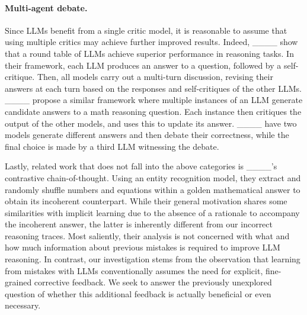 \paragraph{Multi-agent debate.} Since LLMs benefit from a single critic model, it is reasonable to assume that using multiple critics may achieve further improved results. Indeed, ____ show that a round table of LLMs achieve superior performance in reasoning tasks. In their framework, each LLM produces an answer to a question, followed by a self-critique. Then, all models carry out a multi-turn discussion, revising their answers at each turn based on the responses and self-critiques of the other LLMs. ____ propose a similar framework where multiple instances of an LLM generate candidate answers to a math reasoning question. Each instance then critiques the output of the other models, and uses this to update its answer. ____ have two models generate different answers and then debate their correctness, while the final choice is made by a third LLM witnessing the debate. 

\vspace{6pt}

Lastly, related work that does not fall into the above categories is ____'s contrastive chain-of-thought. Using an entity recognition model, they extract and randomly shuffle numbers and equations within a golden mathematical answer to obtain its incoherent counterpart. While their general motivation shares some similarities with implicit learning due to the absence of a rationale to accompany the incoherent answer, the latter is inherently different from our incorrect reasoning traces. Most saliently, their analysis is not concerned with what and how much information about previous mistakes is required to improve LLM reasoning. In contrast, our investigation stems from the observation that learning from mistakes with LLMs conventionally assumes the need for explicit, fine-grained corrective feedback. We seek to answer the previously unexplored question of whether this additional feedback is actually beneficial or even necessary.